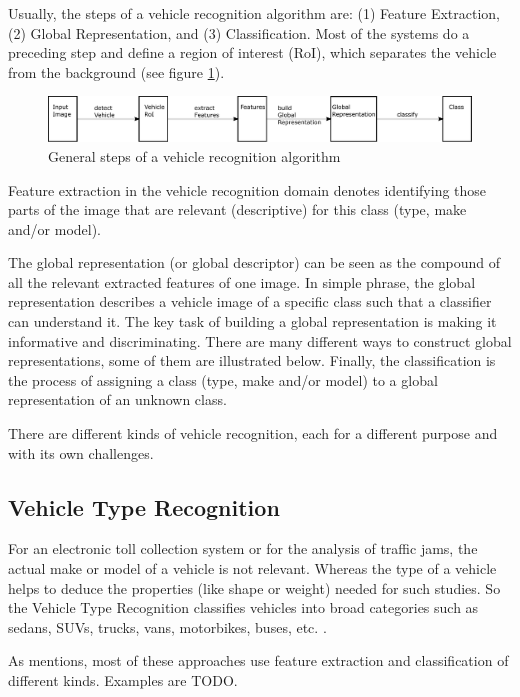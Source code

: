 Usually, the steps of a vehicle recognition algorithm are: (1) Feature Extraction, (2) Global Representation, and (3) Classification. Most of the systems do a preceding step and define a region of interest (RoI), which separates the vehicle from the background (see figure \ref{fig:vrSteps}).

\begin{figure}[bth]
  \centering
        \includegraphics[width=.95\linewidth]{gfx/vr_steps}
        \caption{General steps of a vehicle recognition algorithm}
        \label{fig:vrSteps}
\end{figure}

Feature extraction in the vehicle recognition domain denotes identifying those parts of the image that are relevant (descriptive) for this class (type, make and/or model).

The global representation (or global descriptor) can be seen as the compound of all the relevant extracted features of one image. In simple phrase, the global representation describes a vehicle image of a specific class such that a classifier can understand it. The key task of building a global representation is making it informative and discriminating. There are many different ways to construct global representations, some of them are illustrated below.
Finally, the classification is the process of assigning a class (type, make and/or model) to a global representation of an unknown class.

There are different kinds of vehicle recognition, each for a different purpose and with its own challenges.

\subsection{Vehicle Type Recognition}
For an electronic toll collection system or for the analysis of traffic jams, the actual make or model of a vehicle is not relevant. Whereas the type of a vehicle helps to deduce the properties (like shape or weight) needed for such studies. So the Vehicle Type Recognition classifies vehicles into broad categories such as sedans, SUVs, trucks, vans, motorbikes, buses, etc. \citep{siddiqui2015robust}.

As \citep{siddiqui2015robust} mentions, most of these approaches use feature extraction and classification of different kinds. Examples are TODO.

